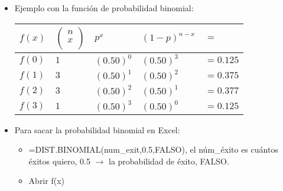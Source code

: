 \begin{itemize}
    \item Ejemplo con la función de probabilidad binomial:
        \begin{center}
           \begin{tabular}{ | p{1cm} | p{1cm} | p{1cm} | p{1cm} | p{1cm} | }
               \hline
                   $f(x)$ & $\left(\begin{matrix} n \\ x \\ \end{matrix}\right)$ & $p^x$  & $(1-p)^{n-x}$  & $=$  \\
               \hline
                    $f(0)$  & $1$ & $(0.50)^0$ & $(0.50)^3$ & $= 0.125$  \\ 
                    $f(1)$  & $3$ & $(0.50)^1$ & $(0.50)^2$ & $= 0.375$  \\ 
                    $f(2)$  & $3$ & $(0.50)^2$ & $(0.50)^1$ & $= 0.377$  \\ 
                    $f(3)$  & $1$ & $(0.50)^3$ & $(0.50)^0$ & $= 0.125$  \\ 
                \hline
           \end{tabular}
        \end{center}
    
    \item Para sacar la probabilidad binomial en Excel: 
        \begin{itemize}[label=$\downarrow$]
           \item =DIST.BINOMIAL(num\_exit,0.5,FALSO), el núm\_éxito es cuántos éxitos quiero, 0.5 $\rightarrow$ la probabilidad de éxito, FALSO.
           \item Abrir f(x)
        \end{itemize}
\end{itemize}
